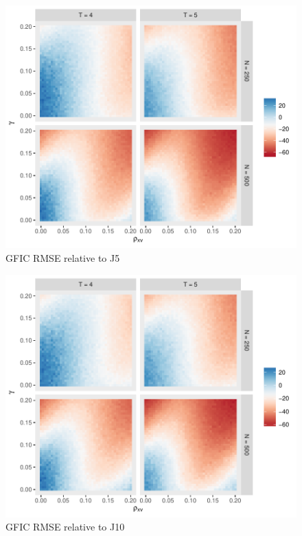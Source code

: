 \begin{figure}
\centering
\includegraphics[scale = 0.8]{./simulations/DynamicPanel/results/Dpanel_GFIC_RMSE_rel_J5}
\caption{GFIC RMSE relative to J5}
\end{figure}
\begin{figure}
\centering
\includegraphics[scale = 0.8]{./simulations/DynamicPanel/results/Dpanel_GFIC_RMSE_rel_J10}
\caption{GFIC RMSE relative to J10}
\end{figure}

